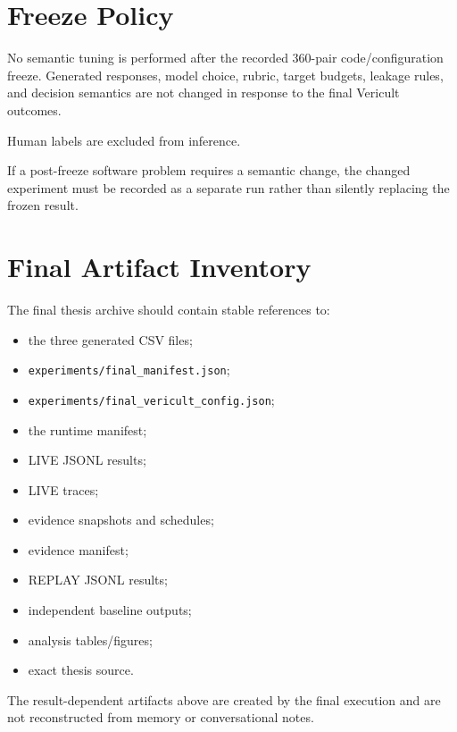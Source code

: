 \section*{Freeze Policy}

No semantic tuning is performed after the recorded 360-pair code/configuration freeze. Generated responses, model choice, rubric, target budgets, leakage rules, and decision semantics are not changed in response to the final Vericult outcomes.

Human labels are excluded from inference.

If a post-freeze software problem requires a semantic change, the changed experiment must be recorded as a separate run rather than silently replacing the frozen result.

\section*{Final Artifact Inventory}

The final thesis archive should contain stable references to:

\begin{itemize}
\item the three generated CSV files;
\item \texttt{experiments/final\_manifest.json};
\item \texttt{experiments/final\_vericult\_config.json};
\item the runtime manifest;
\item LIVE JSONL results;
\item LIVE traces;
\item evidence snapshots and schedules;
\item evidence manifest;
\item REPLAY JSONL results;
\item independent baseline outputs;
\item analysis tables/figures;
\item exact thesis source.
\end{itemize}

The result-dependent artifacts above are created by the final execution and are not reconstructed from memory or conversational notes.
